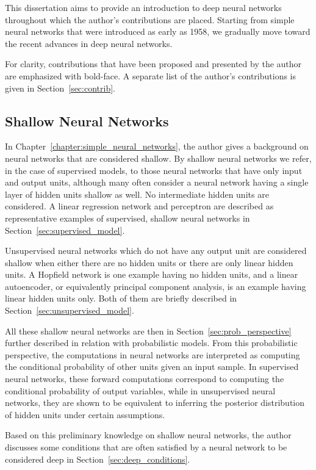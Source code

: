 \documentclass[dissertation,nocontribution]{aaltoseries}
\begin{document}
This dissertation aims to provide an introduction to deep
neural networks throughout which the author's contributions
are placed. Starting from simple neural networks that were
introduced as early as 1958, we gradually move toward the
recent advances in deep neural networks. 

For clarity, contributions that have been proposed and presented by
the author are emphasized with bold-face. A separate list of
the author's contributions is given in
Section~\ref{sec:contrib}.

\subsection{Shallow Neural Networks}

In Chapter~\ref{chapter:simple_neural_networks}, the author
gives a background on neural networks that are
considered shallow. By shallow neural networks we refer, in
the case of supervised models, to those neural networks that
have only input and output units, although many often
consider a neural network having a single layer of hidden
units shallow as well. No intermediate hidden units are
considered. A linear regression network and
perceptron are described as representative examples
of supervised, shallow neural networks in
Section~\ref{sec:supervised_model}.

Unsupervised neural networks which do not have any output
unit are considered shallow when either there are no hidden
units or there are only linear hidden units. A
Hopfield network is one example having no hidden
units, and a linear autoencoder, or equivalently
principal component analysis, is an example having linear
hidden units only. Both of them are briefly described in
Section~\ref{sec:unsupervised_model}.

All these shallow neural networks are then in
Section~\ref{sec:prob_perspective} further described in
relation with probabilistic models. From this probabilistic
perspective, the computations in neural networks are
interpreted as computing the conditional probability of other
units given an input sample. In supervised neural networks,
these forward computations correspond to computing the
conditional probability of output variables, while in
unsupervised neural networks, they are shown to be
equivalent to inferring the posterior distribution of hidden
units under certain assumptions.

Based on this preliminary knowledge on shallow neural
networks, the author discusses some 
conditions 
that are often satisfied by a neural network to
be considered deep in
Section~\ref{sec:deep_conditions}. 
\end{document}
